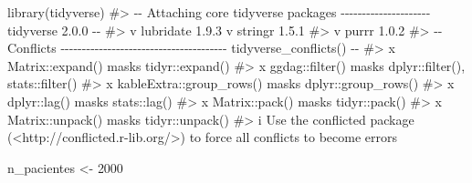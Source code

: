 \documentclass[
  letterpaper,
  DIV=11,
  numbers=noendperiod,
  oneside]{scrreprt}
\newenvironment{Shaded}{\begin{snugshade}}{\end{snugshade}}
\newcommand{\CommentTok}[1]{\textcolor[rgb]{0.37,0.37,0.37}{#1}}
\newcommand{\DecValTok}[1]{\textcolor[rgb]{0.68,0.00,0.00}{#1}}
\newcommand{\FunctionTok}[1]{\textcolor[rgb]{0.28,0.35,0.67}{#1}}
\newcommand{\NormalTok}[1]{\textcolor[rgb]{0.00,0.23,0.31}{#1}}
\newcommand{\OtherTok}[1]{\textcolor[rgb]{0.00,0.23,0.31}{#1}}
\begin{document}
\begin{Shaded}
\begin{Highlighting}[]
\FunctionTok{library}\NormalTok{(tidyverse)}
\CommentTok{\#\textgreater{} {-}{-} Attaching core tidyverse packages {-}{-}{-}{-}{-}{-}{-}{-}{-}{-}{-}{-}{-}{-}{-}{-}{-}{-}{-}{-}{-} tidyverse 2.0.0 {-}{-}}
\CommentTok{\#\textgreater{} v lubridate 1.9.3     v stringr   1.5.1}
\CommentTok{\#\textgreater{} v purrr     1.0.2     }
\CommentTok{\#\textgreater{} {-}{-} Conflicts {-}{-}{-}{-}{-}{-}{-}{-}{-}{-}{-}{-}{-}{-}{-}{-}{-}{-}{-}{-}{-}{-}{-}{-}{-}{-}{-}{-}{-}{-}{-}{-}{-}{-}{-}{-}{-}{-}{-} tidyverse\_conflicts() {-}{-}}
\CommentTok{\#\textgreater{} x Matrix::expand()         masks tidyr::expand()}
\CommentTok{\#\textgreater{} x ggdag::filter()          masks dplyr::filter(), stats::filter()}
\CommentTok{\#\textgreater{} x kableExtra::group\_rows() masks dplyr::group\_rows()}
\CommentTok{\#\textgreater{} x dplyr::lag()             masks stats::lag()}
\CommentTok{\#\textgreater{} x Matrix::pack()           masks tidyr::pack()}
\CommentTok{\#\textgreater{} x Matrix::unpack()         masks tidyr::unpack()}
\CommentTok{\#\textgreater{} i Use the conflicted package (\textless{}http://conflicted.r{-}lib.org/\textgreater{}) to force all conflicts to become errors}

\NormalTok{n\_pacientes }\OtherTok{\textless{}{-}} \DecValTok{2000}


\end{Highlighting}
\end{Shaded}
\end{document}
